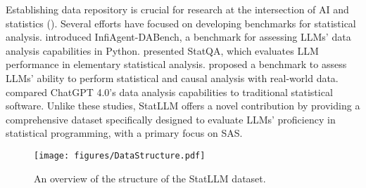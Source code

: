 Establishing data repository is crucial for research at the intersection of AI and statistics (). Several efforts have focused on developing benchmarks for statistical analysis.  introduced InfiAgent-DABench, a benchmark for assessing LLMs' data analysis capabilities in Python.  presented StatQA, which evaluates LLM performance in elementary statistical analysis.  proposed a benchmark to assess LLMs' ability to perform statistical and causal analysis with real-world data.  compared ChatGPT 4.0's data analysis capabilities to traditional statistical software. Unlike these studies, StatLLM offers a novel contribution by providing a comprehensive dataset specifically designed to evaluate LLMs' proficiency in statistical programming, with a primary focus on SAS.









\begin{figure}%
\begin{center}
\texttt{[image: figures/DataStructure.pdf]}
\caption{An overview of the structure of the StatLLM dataset.}\label{fig:data.structure}
\end{center}
\end{figure}


